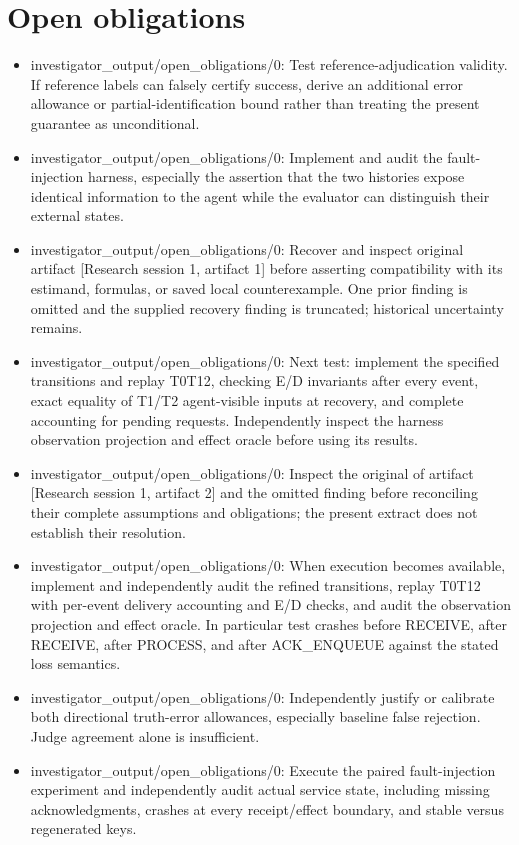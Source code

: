 \documentclass[11pt]{article}
\begin{document}
\section{Open obligations}
\begin{itemize}
\item investigator\_output/open\_obligations/0: Test reference-adjudication validity. If reference labels can falsely certify success, derive an additional error allowance or partial-identification bound rather than treating the present guarantee as unconditional.
\item investigator\_output/open\_obligations/0: Implement and audit the fault-injection harness, especially the assertion that the two histories expose identical information to the agent while the evaluator can distinguish their external states.
\item investigator\_output/open\_obligations/0: Recover and inspect original artifact [Research session 1, artifact 1] before asserting compatibility with its estimand, formulas, or saved local counterexample. One prior finding is omitted and the supplied recovery finding is truncated; historical uncertainty remains.
\item investigator\_output/open\_obligations/0: Next test: implement the specified transitions and replay T0\textendash{}T12, checking E/D invariants after every event, exact equality of T1/T2 agent-visible inputs at recovery, and complete accounting for pending requests. Independently inspect the harness observation projection and effect oracle before using its results.
\item investigator\_output/open\_obligations/0: Inspect the original of artifact [Research session 1, artifact 2] and the omitted finding before reconciling their complete assumptions and obligations; the present extract does not establish their resolution.
\item investigator\_output/open\_obligations/0: When execution becomes available, implement and independently audit the refined transitions, replay T0\textendash{}T12 with per-event delivery accounting and E/D checks, and audit the observation projection and effect oracle. In particular test crashes before RECEIVE, after RECEIVE, after PROCESS, and after ACK\_ENQUEUE against the stated loss semantics.
\item investigator\_output/open\_obligations/0: Independently justify or calibrate both directional truth-error allowances, especially baseline false rejection. Judge agreement alone is insufficient.
\item investigator\_output/open\_obligations/0: Execute the paired fault-injection experiment and independently audit actual service state, including missing acknowledgments, crashes at every receipt/effect boundary, and stable versus regenerated keys.

\end{itemize}
\end{document}
